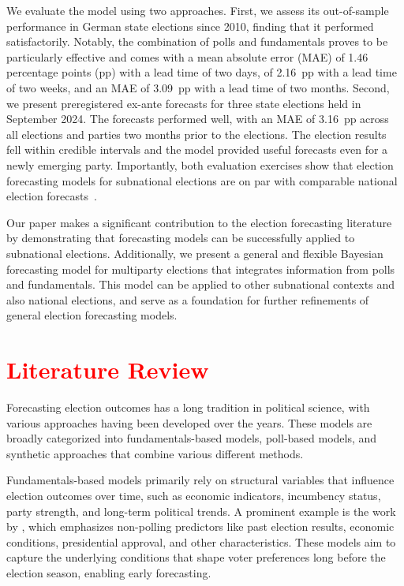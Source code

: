\documentclass[12pt]{article}
\begin{document}
\begin{doublespacing}
We evaluate the model using two approaches. First, we assess its out-of-sample performance in German state elections since 2010, finding that it performed satisfactorily. Notably, the combination of polls and fundamentals proves to be particularly effective and comes with a mean absolute error (MAE) of 1.46 percentage points (pp) with a lead time of two days, of 2.16~pp with a lead time of two weeks, and an MAE of 3.09~pp with a lead time of two months.  Second, we present preregistered ex-ante forecasts for three state elections held in September 2024. The forecasts performed well, with an MAE of 3.16~pp across all elections and parties two months prior to the elections. The election results fell within credible intervals and the model provided useful forecasts even for a newly emerging party. Importantly, both evaluation exercises show that election forecasting models for subnational elections are on par with comparable national election forecasts~\citep{jennings2018election,shirani2018disentangling,munzert_2017}.

Our paper makes a significant contribution to the election forecasting literature by demonstrating that forecasting models can be successfully applied to subnational elections. Additionally, we present a general and flexible Bayesian forecasting model for multiparty elections that integrates information from polls and fundamentals. This model can be applied to other subnational contexts and also national elections, and serve as a foundation for further refinements of general election forecasting models.

\section{\textcolor{red}{Literature Review}}

Forecasting election outcomes has a long tradition in political science, with various approaches having been developed over the years. These models are broadly categorized into fundamentals-based models, poll-based models, and synthetic approaches that combine various different methods.

Fundamentals-based models primarily rely on structural variables that influence election outcomes over time, such as economic indicators, incumbency status, party strength, and long-term political trends. A prominent example is the work by \citet{hummel2014fundamental}, which emphasizes non-polling predictors like past election results, economic conditions, presidential approval, and other characteristics. These models aim to capture the underlying conditions that shape voter preferences long before the election season, enabling early forecasting.


\end{doublespacing}
\end{document}
